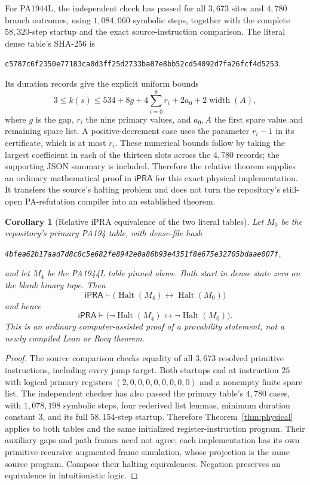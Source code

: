 \documentclass[11pt]{article}
\newtheorem{corollary}[theorem]{Corollary}
\newcommand{\ipra}{\mathsf{iPRA}}
\begin{document}
For PA1944L, the independent check has passed for all $3,673$ sites and
$4,780$ branch outcomes, using $1,084,060$ symbolic steps, together with
the complete $58,320$-step startup and the exact source-instruction
comparison. The literal dense table's SHA-256 is
\begin{center}\small\texttt{c5787c6f2350e77183ca0d3ff25d2733ba87e8bb52cd54092d7fa26fcf4d5253}.\end{center}
Its duration records give the explicit uniform bounds
\[
 3\le k(s)\le
 534+8g+4\sum_{i=0}^{8}r_i+2a_0+2\operatorname{width}(A),
\]
where $g$ is the gap, $r_i$ the nine primary values, and $a_0,A$ the
first spare value and remaining spare list. A positive-decrement case
uses the parameter $r_i-1$ in its certificate, which is at most $r_i$.
These numerical bounds follow by taking the largest coefficient in each
of the thirteen slots across the $4,780$ records; the supporting JSON
summary is included. Therefore the relative theorem supplies an ordinary
mathematical proof in $\ipra$ for this exact physical implementation.
It transfers the source's halting problem and does not turn the
repository's still-open PA-refutation compiler into an established theorem.

\begin{corollary}[Relative iPRA equivalence of the two literal tables]
Let $M_0$ be the repository's primary PA194 table, with dense-file hash
\begin{center}\small\texttt{4bfea62b17aad7d8c8c5e682fe8942e0a86b93e4351f8e675e32705bdaae007f},\end{center}
and let $M_4$ be the PA1944L table pinned above. Both start in dense state
zero on the blank binary tape. Then
\[
 \ipra\vdash
 \bigl(\operatorname{Halt}(M_4)\leftrightarrow\operatorname{Halt}(M_0)\bigr)
\]
and hence
\[
 \ipra\vdash
 \bigl(\neg\operatorname{Halt}(M_4)\leftrightarrow
       \neg\operatorname{Halt}(M_0)\bigr).
\]
This is an ordinary computer-assisted proof of a provability statement,
not a newly compiled Lean or Rocq theorem.
\end{corollary}
\begin{proof}
The source comparison checks equality of all $3,673$ resolved primitive
instructions, including every jump target. Both startups end at instruction
$25$ with logical primary registers $(2,0,0,0,0,0,0,0,0)$ and a nonempty
finite spare list. The independent checker has also passed the primary
table's $4,780$ cases, with $1,078,198$ symbolic steps, four rederived
list lemmas, minimum duration constant $3$, and its full $58,154$-step
startup. Therefore Theorem~\ref{thm:physical} applies to both tables and
the same initialized register-instruction program. Their auxiliary gaps
and path frames need not agree; each implementation has its own
primitive-recursive augmented-frame simulation, whose projection is the
same source program. Compose their halting equivalences. Negation
preserves an equivalence in intuitionistic logic.
\end{proof}
\end{document}
